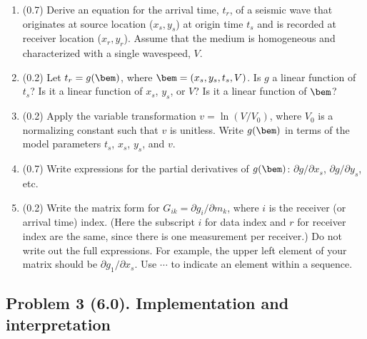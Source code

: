 \documentclass[11pt,titlepage,fleqn]{article}
\begin{document}
\begin{enumerate}
\item (0.7) Derive an equation for the arrival time, $t_r$,  of a seismic wave that originates at source location ($x_s, y_s$) at origin time $t_s$ and is recorded at receiver location ($x_r, y_r$). Assume that the medium is homogeneous and characterized with a single wavespeed, $V$.

\item (0.2) Let $t_r = g(\bem)$, where $\bem = (x_s,y_s,t_s,V)$.
Is $g$ a linear function of $t_s$? Is it a linear function of $x_s$, $y_s$, or $V$?
Is it a linear function of $\bem$?

\item (0.2) Apply the variable transformation $v = \ln(V/V_0)$, where $V_0$ is a normalizing constant such that $v$ is unitless. Write $g(\bem)$ in terms of the model parameters $t_s$, $x_s$, $y_s$, and $v$.

\item (0.7) Write expressions for the partial derivatives of $g(\bem)$: $\partial g/ \partial x_s$, $\partial g/ \partial y_s$, etc.

\item (0.2) Write the matrix form for $G_{ik} = \partial g_i/ \partial m_k$, where $i$ is the receiver (or arrival time) index. (Here the subscript $i$ for data index and $r$ for receiver index are the same, since there is one measurement per receiver.) Do not write out the full expressions. For example, the upper left element of your matrix should be $\partial g_1/\partial x_s$. Use $\cdots$ to indicate an element within a sequence.

\end{enumerate}


\pagebreak
\subsection*{Problem 3 (6.0). Implementation and interpretation}
\end{document}
